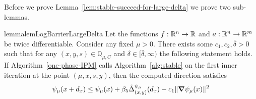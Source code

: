 \documentclass{article}
\begin{document}
Before we prove Lemma~\ref{lem:stable-succeed-for-large-delta} we prove two sub-lemmas.

\begin{restatable}{lemma}{lemLogBarrierLargeDelta} \label{lem:log-barrier-large-delta}
Let the functions $f : \mathbb{R}^{n} \rightarrow \mathbb{R}$ and $a : \mathbb{R}^{n} \rightarrow \mathbb{R}^{m}$ be twice differentiable. Consider any fixed $\mu > 0$.
There exists some $c_{1}, c_{2}, \bar{\delta} > 0$ such that for any $(x,y,s) \in \mathbb{Q}_{\mu,C}$ and $\delta \in [\bar{\delta}, \infty)$ the following statement holds. If Algorithm~\ref{one-phase-IPM} calls Algorithm~\ref{alg:stable} on the first inner iteration at the point $(\mu, x, s, y)$, then the computed direction satisfies 
$$
\psi_{\mu} (x + d_{x}) \le \psi_{\mu} (x) + \beta_{5} \tilde{\Delta}^{\psi_{\mu}}_{(x,y)}( d_{x} ) - c_1 \| \grad \psi_{\mu} (x) \|^2
$$
\end{restatable}
\end{document}
